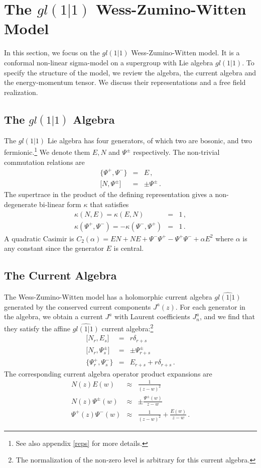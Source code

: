 \documentclass[12pt]{article}
\numberwithin{equation}{section}
\numberwithin{equation}{section}
\numberwithin{table}{section}\setlength{\multlinegap}{25pt}
\begin{document}
\section{The $gl(1|1)$ Wess-Zumino-Witten Model}
\label{gl11wzw}
In this section, we focus on the $gl(1|1)$ Wess-Zumino-Witten model. It is a conformal non-linear sigma-model
on a supergroup with Lie algebra $gl(1|1)$. To specify the structure of the model, we review the algebra,
the current algebra and the energy-momentum tensor. We discuss their representations and a free field
realization.
\subsection{The $gl(1|1)$ Algebra}
The $gl(1|1)$ Lie algebra has four generators, of which two are bosonic, and two fermionic.\footnote{See also appendix \ref{reps} for more details.} We denote
them $E,N$ and $\Psi^\pm$ respectively. The non-trivial commutation relations are
\begin{eqnarray}
\{ \Psi^+, \Psi^- \} &=& E \, , 
\nonumber \\
{[} N , \Psi^\pm {]} &=& \pm \Psi^\pm \, .
\end{eqnarray}
The supertrace in the product of the defining representation gives
a non-degenerate bi-linear form $\kappa$ that satisfies
\begin{eqnarray}
\kappa(N,E) = \kappa(E,N) &=& 1 \, ,
\nonumber \\
\kappa(\Psi^+,\Psi^-) = - \kappa(\Psi^-,\Psi^+) &=& 1 \, .
\end{eqnarray}
A quadratic Casimir is $C_2(\alpha)=EN+NE + \Psi^- \Psi^+- \Psi^+ \Psi^- + \alpha E^2$ where $\alpha$ is any  constant
since the generator $E$ is central.
\subsection{The Current Algebra}
The Wess-Zumino-Witten model has a holomorphic current algebra $\widehat{gl(1|1)}$ generated by the conserved current components
$J^a(z)$.
For each generator in the algebra, we obtain a current $J^a$ with Laurent coefficients $J^a_n$, and we find that they satisfy the affine $\widehat{gl(1|1)}$
current algebra:\footnote{The normalization of the non-zero level is arbitrary for this current algebra.}
\begin{eqnarray}
{[} N_r , E_{s} {]} &=&  r  \delta_{r+s} \nonumber \\
{[} N_r , \Psi^\pm_{s} {]} &=& \pm \Psi^{\pm}_{r+s} \nonumber \\
{\{} \Psi^+_r , \Psi^-_{s} {\}} &=& E_{r+s}+ r  \delta_{r+s}  \, .
\end{eqnarray}
The corresponding current algebra operator product expansions are
\begin{eqnarray}
N(z) E(w) & \approx & \frac{1}{(z-w)^2}
\nonumber \\
N(z) \Psi^{\pm}(w) & \approx & \pm \frac{\Psi^{\pm}(w)}{z-w}
\nonumber \\
\Psi^{+}(z) \Psi^-(w) & \approx & \frac{1}{(z-w)^2} + \frac{E(w)}{z-w}
\, .
\end{eqnarray} 
\end{document}
